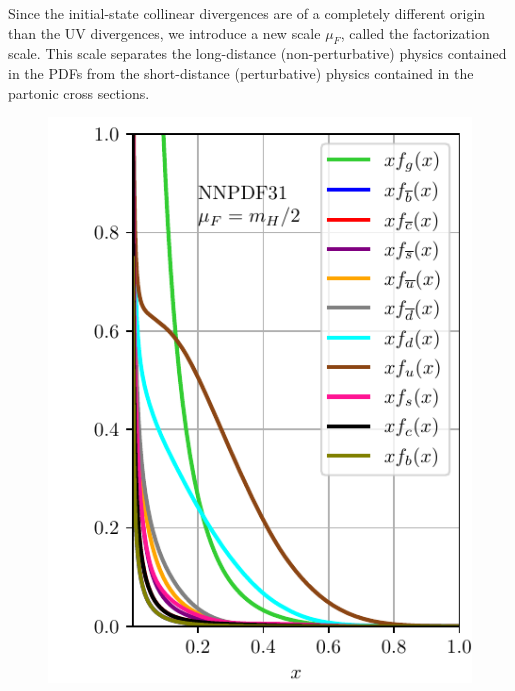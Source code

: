 Since the initial-state collinear divergences are of a completely different origin than the \acs{UV} divergences, we introduce a new scale $\mu_F$, called the factorization scale. This scale separates the long-distance (non-perturbative) physics contained in the PDFs from the short-distance (perturbative) physics contained in the partonic cross sections.

\begin{figure}[ht]
\begin{minipage}[t]{0.48\textwidth}
\centering
\includegraphics[width=\textwidth]{Images/PDF.pdf}
\label{fig:2:PDF}
\end{minipage}
\hspace{0.02\textwidth}
\begin{minipage}[t]{0.48\textwidth}

\end{minipage}
\end{figure}
